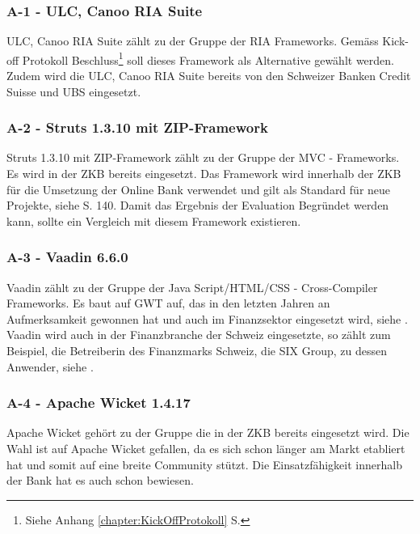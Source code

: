   \subsubsection{A-1 - ULC, Canoo RIA Suite}
  
  ULC, Canoo RIA Suite zählt zu der Gruppe der \ac{RIA} Frameworks. Gemäss
  Kick-off Protokoll Beschluss\footnote{Siehe Anhang
  \ref{chapter:KickOffProtokoll}  S.
  \pageref{chapter:KickOffProtokoll}} soll dieses Framework als Alternative
  gewählt werden. Zudem wird die ULC, Canoo RIA Suite bereits von den Schweizer
  Banken Credit Suisse und UBS eingesetzt.
  
  \subsubsection{A-2 - Struts 1.3.10 mit ZIP-Framework}
  
  Struts 1.3.10 mit ZIP-Framework zählt zu der Gruppe der MVC - Frameworks. Es
  wird in der \ac{ZKB} bereits eingesetzt. Das Framework wird innerhalb der
  \ac{ZKB} für die Umsetzung der Online Bank verwendet und gilt als Standard
  für neue Projekte, siehe \cite{ZkbHandbuchDerItArchitektur}  S. 140. Damit
  das Ergebnis der Evaluation Begründet werden kann, sollte ein Vergleich mit
  diesem Framework existieren.
  
  \subsubsection{A-3 - Vaadin 6.6.0}
  
  Vaadin zählt zu der Gruppe der Java Script/\ac{HTML}/\ac{CSS} -
  Cross-Compiler Frameworks. Es baut auf \ac{GWT} auf, das in den letzten
  Jahren an Aufmerksamkeit gewonnen hat und auch im Finanzsektor eingesetzt
  wird, siehe \cite{GWTImFinanzSektor}. Vaadin wird auch in der Finanzbranche
  der Schweiz eingesetzte, so zählt zum Beispiel, die Betreiberin des
  Finanzmarks Schweiz, die SIX Group, zu dessen Anwender, siehe
  \cite{VaadinInDerSchweiz}.
  
  \subsubsection{A-4 - Apache Wicket 1.4.17}
  
  Apache Wicket gehört zu der Gruppe die in der ZKB bereits eingesetzt wird.
  Die Wahl ist auf Apache Wicket gefallen, da es sich schon länger am Markt
  etabliert hat und somit auf eine breite Community stützt. Die
  Einsatzfähigkeit innerhalb der Bank  hat es auch schon bewiesen.
  
